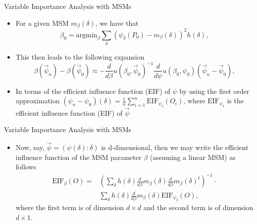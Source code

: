 \documentclass{beamer}
\begin{document}

\begin{frame}[c]{Variable Importance Analysis with MSMs}

\begin{center}
\begin{itemize}
  \itemsep10pt
  \item For a given MSM $m_{\beta}(\delta)$, we have that
    $$\beta_0 = \text{argmin}_{\beta} \sum_{\delta}(\psi_{\delta}(P_0) -
    m_{\beta}(\delta))^2 h(\delta),$$
  \item This then leads to the following expansion
    $$\beta(\vec{\psi}_n) - \beta(\vec{\psi}_0) \approx -\frac{d}{d\beta}
    u(\beta_0, \vec{\psi}_0)^{-1} \frac{d}{d\psi} u(\beta_0,
    \psi_0)(\vec{\psi}_n - \vec{\psi}_0),$$
  \item In terms of the efficient influence function (EIF) of $\psi$ by using
    the first order approximation $(\psi_n - \psi_0)(\delta) =
    \frac{1}{n}\sum_{i = 1}^n \text{EIF}_{\psi_{\delta}}(O_i)$, where
    $\text{EIF}_{\psi_{\delta}}$ is the efficient influence function (EIF) of
    $\vec{\psi}$
\end{itemize}
\end{center}

\note{
}

\end{frame}


\begin{frame}[c]{Variable Importance Analysis with MSMs}

\begin{center}
\begin{itemize}
  \itemsep10pt
  \item Now, say, $\vec{\psi} = (\psi(\delta): \delta)$ is d-dimensional, then
    we may write the efficient influence function of the MSM parameter $\beta$
    (assuming a linear MSM) as follows
    \begin{align*}
      \text{EIF}_{\beta}(O) =& \left(\sum_{\delta} h(\delta) \frac{d}{d\beta}
      m_{\beta}(\delta) \frac{d}{d\beta} m_{\beta}(\delta)^t \right)^{-1}
      \cdot \\ &\sum_{\delta} h(\delta) \frac{d}{d\beta} m_{\beta}(\delta)
      \text{EIF}_{\psi_{\delta}}(O),
    \end{align*}
    where the first term is of dimension $d \times d$ and the second term is of
    dimension $d \times 1$.
\end{itemize}
\end{center}

\note{
}

\end{frame}

\end{document}
